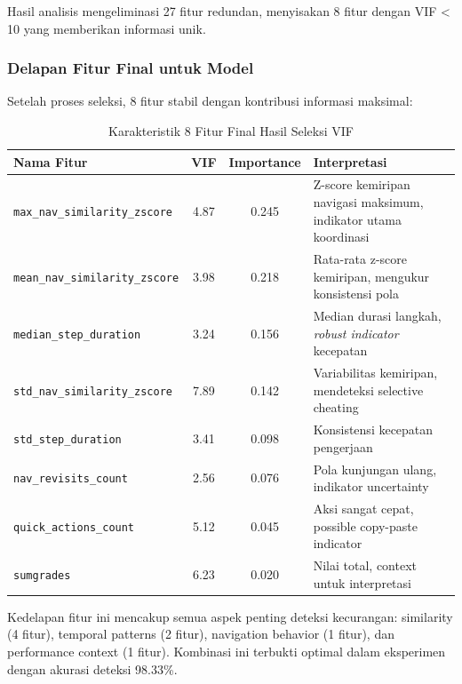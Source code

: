 Hasil analisis mengeliminasi 27 fitur redundan, menyisakan 8 fitur dengan VIF < 10 yang memberikan informasi unik.

\subsubsection{Delapan Fitur Final untuk Model}
\label{sec:fiturFinal}

Setelah proses seleksi, 8 fitur stabil dengan kontribusi informasi maksimal:

\begin{table}[htbp]
\centering
\caption{Karakteristik 8 Fitur Final Hasil Seleksi VIF}
\label{tabel:fiturFinalKarakteristik}
\begin{tabular}{|p{5cm}|c|c|p{5cm}|}
\hline
\textbf{Nama Fitur} & \textbf{VIF} & \textbf{Importance} & \textbf{Interpretasi} \\
\hline
\texttt{max\_nav\_similarity\_zscore} & 4.87 & 0.245 & Z-score kemiripan navigasi maksimum, indikator utama koordinasi \\
\hline
\texttt{mean\_nav\_similarity\_zscore} & 3.98 & 0.218 & Rata-rata z-score kemiripan, mengukur konsistensi pola \\
\hline
\texttt{median\_step\_duration} & 3.24 & 0.156 & Median durasi langkah, \textit{robust indicator} kecepatan \\
\hline
\texttt{std\_nav\_similarity\_zscore} & 7.89 & 0.142 & Variabilitas kemiripan, mendeteksi selective cheating \\
\hline
\texttt{std\_step\_duration} & 3.41 & 0.098 & Konsistensi kecepatan pengerjaan \\
\hline
\texttt{nav\_revisits\_count} & 2.56 & 0.076 & Pola kunjungan ulang, indikator uncertainty \\
\hline
\texttt{quick\_actions\_count} & 5.12 & 0.045 & Aksi sangat cepat, possible copy-paste indicator \\
\hline
\texttt{sumgrades} & 6.23 & 0.020 & Nilai total, context untuk interpretasi \\
\hline
\end{tabular}
\end{table}

Kedelapan fitur ini mencakup semua aspek penting deteksi kecurangan: similarity (4 fitur), temporal patterns (2 fitur), navigation behavior (1 fitur), dan performance context (1 fitur). Kombinasi ini terbukti optimal dalam eksperimen dengan akurasi deteksi 98.33\%.

